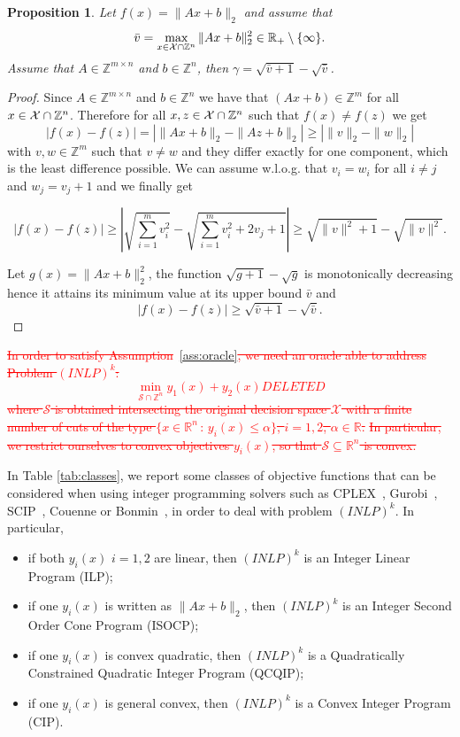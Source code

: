 \documentclass[preprint,12pt]{elsarticle}
\newcommand{\red}[1]{\textcolor{red}{#1}}
\newtheorem{proposition}[theorem]{Proposition}
\def\X{{\cal X}}
\def\R{\mathbb{R}}
\def\Z{\mathbb{Z}}
\begin{document}
\begin{proposition}\label{prop:condquad}
Let $f(x) =\|A x+ b\|_2 $ and assume that $$\bar v=\max_{x \in \X\cap \Z^n} \|A x+ b\|^2_2 \in \R_+\setminus \{\infty\}.$$
Assume that $A \in \Z^{m\times n}$ and $b \in \Z^n$, then  $\gamma = \sqrt{\bar v+1}-\sqrt{\bar v}$.
\end{proposition}
\begin{proof}
Since $A \in \Z^{m\times n}$ and $b \in \Z^n$
we have that $(Ax+b)\in \Z^m$
for all $x \in \X\cap \Z^n$.
Therefore for all $x,z \in \X\cap \Z^n$ such that $f(x) \neq f(z)$ we get
\[
| f(x) - f(z) | = \left |\|A x+ b\|_2 -\|A z+ b\|_2\right|\ge
\left |\|v\|_2 -\|w\|_2\right|
\]
with $v, w\in \Z^m$ such that $v\neq w$ and they differ exactly for one component, which is the least difference possible.
 We can assume  w.l.o.g. that $ v_i= w_i$ for all $i\neq j$ and $ w_j= v_j+1$ and we finally get

\[
| f(x) - f(z) | \ge  \left |\sqrt{\sum_{i=1}^m v_i^2} -\sqrt{\sum_{i=1}^m v_i^2+2v_j+1}\right|\ge \sqrt{\|v\|^2+1}-\sqrt{\|v\|^2}.
\]

Let $g(x)=\|A x+ b\|^2_2$, the function $\sqrt{g+1}-\sqrt{g}$ is monotonically decreasing hence it attains its minimum value at its upper bound $\bar v$ and
\[
| f(x) - f(z) | \ge   \sqrt{\bar v+1}-\sqrt{\bar v}.
\]
\end{proof}

\red{
\st{In order to satisfy Assumption}~\ref{ass:oracle}\st{, we need an oracle able to address Problem $(INLP)^k$: }
\begin{equation*}
    \min_{\mathcal{S}\cap \Z^n} y_1(x) + y_2(x) DELETED
 \end{equation*}
\st{where $\mathcal{S}$ is obtained intersecting the original decision space $\mathcal{X}$ with a finite number of cuts
of the type $\{x\in \R^n \,:\,y_i(x)\leq \alpha\}$, $i=1,2$, $\alpha\in \R$.}
\st{In particular, we restrict ourselves to convex objectives $y_i(x)$, so that $\mathcal{S}\subseteq \R^n$ is convex.}}

In Table \ref{tab:classes}, we report some classes of objective functions that can be considered when using integer programming solvers
such as CPLEX~\cite{cplex-url}, Gurobi~\cite{gurobi}, SCIP~\cite{GleixnerEiflerGallyetal.2017}, Couenne \cite{} or Bonmin~\cite{bonami2008algorithmic},
in order to deal with problem $(INLP)^k$.
In particular,
\begin{itemize}
 \item if both $y_i(x)$ $i=1,2$ are linear, then $(INLP)^k$ is an Integer Linear Program (ILP);
 \item if one $y_i(x)$ is written as $\|Ax + b\|_2$, then $(INLP)^k$ is an Integer Second Order Cone Program (ISOCP);
 \item if one $y_i(x)$ is convex quadratic, then $(INLP)^k$ is a Quadratically Constrained Quadratic Integer Program (QCQIP);
 \item if one $y_i(x)$ is general convex, then $(INLP)^k$ is a Convex Integer Program (CIP).
\end{itemize}
\end{document}
